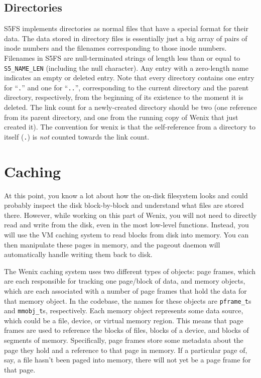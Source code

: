 \subsection{Directories} \label{directories}

S5FS implements directories as normal files that have a special format for their data. The data stored in directory files is essentially just a big array of pairs of inode numbers and the filenames corresponding to those inode numbers. Filenames in S5FS are null-terminated strings of length less than or equal to \texttt{S5\_NAME\_LEN} (including the null character). Any entry with a zero-length name indicates an empty or deleted entry. Note that every directory contains one entry for ``\texttt{.}'' and one for ``\texttt{..}'', corresponding to the current directory and the parent directory, respectively, from the beginning of its existence to the moment it is deleted. The link count for a newly-created directory should be two (one reference from its parent directory, and one from the running copy of Wenix that just created it). The convention for wenix is that the self-reference from a directory to itself (\texttt{.}) is \emph{not} counted towards the link count.

\section{Caching}

At this point, you know a lot about how the on-disk filesystem looks and could probably inspect the disk block-by-block and understand what files are stored there. However, while working on this part of Wenix, you will not need to directly read and write from the disk, even in the most low-level functions. Instead, you will use the VM caching system to read blocks from disk into memory. You can then manipulate these pages in memory, and the pageout daemon will automatically handle writing them back to disk.

The Wenix caching system uses two different types of objects: page frames, which are each responsible for tracking one page/block of data, and memory objects, which are each associated with a number of page frames that hold the data for that memory object. In the codebase, the names for these objects are \texttt{pframe\_t}s and \texttt{mmobj\_t}s, respectively. Each memory object represents some data source, which could be a file, device, or virtual memory region. This means that page frames are used to reference the blocks of files, blocks of a device, and blocks of segments of memory. Specifically, page frames store some metadata about the page they hold and a reference to that page in memory. If a particular page of, say, a file hasn't been paged into memory, there will not yet be a page frame for that page.

